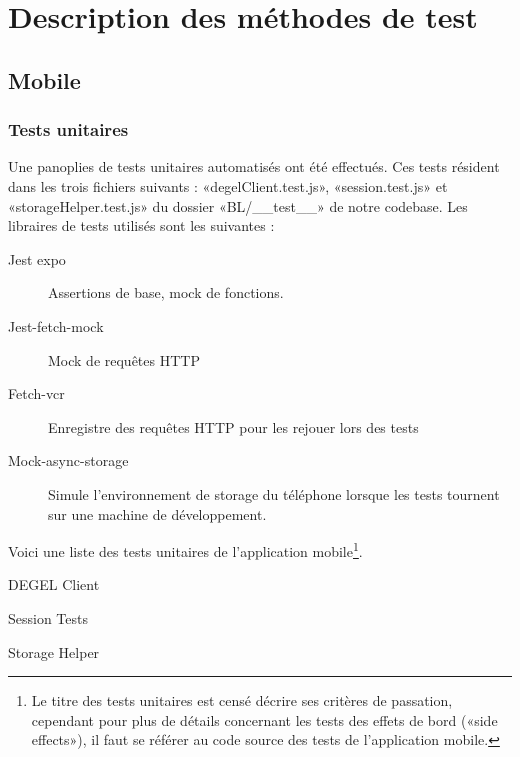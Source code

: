 \section{Description des méthodes de test}
    \subsection{Mobile}
        \subsubsection{Tests unitaires}
        Une panoplies de tests unitaires automatisés ont été effectués. Ces tests résident dans les trois fichiers suivants : «degelClient.test.js», «session.test.js» et «storageHelper.test.js» du dossier «BL/\_\_test\_\_» de notre codebase. Les libraires de tests utilisés sont les suivantes :
        \begin{description}
            \item[Jest expo] Assertions de base, mock de fonctions.
            \item [Jest-fetch-mock] Mock de requêtes HTTP
            \item[Fetch-vcr] Enregistre des requêtes HTTP pour les rejouer lors des tests
            \item[Mock-async-storage] Simule l'environnement de storage du téléphone lorsque les tests tournent sur une machine de développement.
        \end{description}

        Voici une liste des tests unitaires de l'application mobile\footnote{Le titre des tests unitaires est censé décrire ses critères de passation, cependant pour plus de détails concernant les tests des effets de bord («side effects»), il faut se référer au code source des tests de l'application mobile.}.
                
        \begin{table}[hp]
            \centering
            \caption{DEGEL Client}
            
            \label{tab.testsDegel}
        \end{table}
        
        \begin{table}[hp]
            \centering
            \caption{Session Tests}
            
            \label{tab.testsSession}
        \end{table}

        \begin{table}[hp]
            \centering
            \caption{Storage Helper}
            
            \label{tab.testsStorage}
        \end{table}
                
